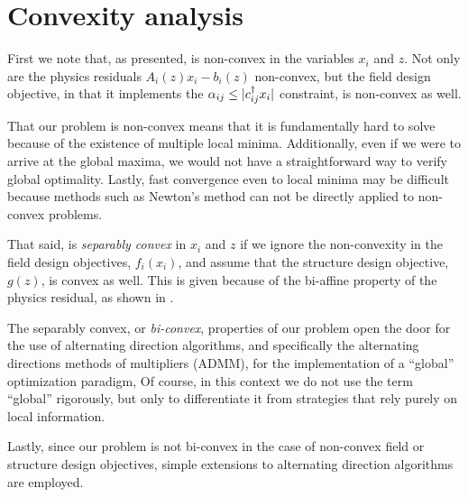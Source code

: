 \section{Convexity analysis}
First we note that, as presented, 
     is non-convex 
    in the variables $x_i$ and $z$. %
Not only are the physics residuals $A_i(z)x_i - b_i(z)$ non-convex,
    but the field design objective, in that it implements the 
    $ \alpha_{ij} \le |c_{ij}^\dagger x_i| $ constraint, is non-convex as well.

That our problem is non-convex means that it is fundamentally hard to solve
    because of the existence of multiple local minima.
Additionally, even if we were to arrive at the global maxima,
    we would not have a straightforward way to verify global optimality.
Lastly, fast convergence even to local minima may be difficult
    because methods such as Newton's method
    can not be directly applied to non-convex problems.

That said,  is \emph{separably convex} 
    in $x_i$ and $z$ if we ignore the non-convexity
    in the field design objectives, $f_i(x_i)$, and
    assume that the structure design objective, $g(z)$, is convex as well.
This is given because of the bi-affine property
    of the physics residual, as shown in .

The separably convex, or \emph{bi-convex}, properties of our problem
    open the door for the use of alternating direction algorithms,
    and specifically the alternating directions 
    methods of multipliers (ADMM), %
    for the implementation of a ``global'' optimization paradigm,
Of course, in this context we do not use the term ``global'' rigorously,
    but only to differentiate it from strategies that rely
    purely on local information.

Lastly, since our problem is not bi-convex 
    in the case of non-convex field or structure design objectives,
    simple extensions to alternating direction algorithms are employed.

